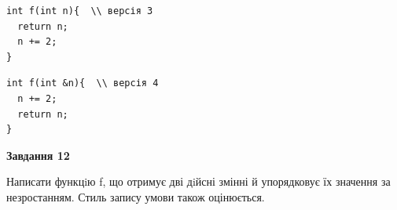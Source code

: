 \documentclass[12pt, ukrainian]{article}
\begin{document}
{\begin {large}
\begin{minipage}[t]{11.0cm}
\vspace{-8mm}\begin{verbatim}
int f(int n){  \\ версія 3
  return n;
  n += 2;
}
\end{verbatim}

\vspace{-8mm}\begin{verbatim}
int f(int &n){  \\ версія 4
  n += 2;
  return n;
}
\end{verbatim}



\begin{center}
\textbf{Завдання 12}
\end{center}

Написати функцiю f, що отримує дві дiйсні змінні й упорядковує їх значення за незростанням. Стиль запису умови також оцінюється.\par

\end{minipage}

\end {large}}
\newpage
\end{document}
